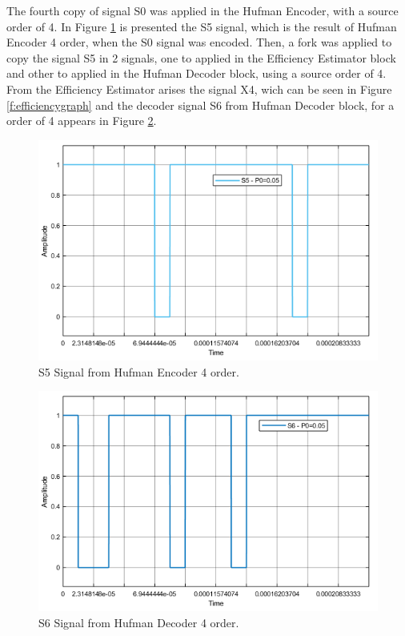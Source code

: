 \begin{refsection}
The fourth copy of signal S0 was applied in the Hufman Encoder, with a source order of 4. In Figure \ref{f:S5} is presented the S5 signal, which is the result of Hufman Encoder 4 order, when the S0 signal was encoded.
Then, a fork was applied to copy the signal S5 in 2 signals, one to applied in the Efficiency Estimator block and other to applied in the Hufman Decoder block, using a source order of 4.
From the Efficiency Estimator arises the signal X4, wich can be seen in Figure \ref{f:efficiencygraph} and the decoder signal S6 from Hufman Decoder block, for a order of 4 appears in Figure \ref{f:S6}.


\begin{figure}[!h]
\centering
\includegraphics[width=5in]{./sdf/eit_45550_estimator_source_code_efficiency/figures/S5.png}
\caption[S5 Signal from Hufman Encoder 4 order.]{S5 Signal from Hufman Encoder 4 order.}
\label{f:S5}
\end{figure}


\begin{figure}[!h]
\centering
\includegraphics[width=5in]{./sdf/eit_45550_estimator_source_code_efficiency/figures/S6.png}
\caption[S6 Signal from Hufman Decoder 4 order.]{S6 Signal from Hufman Decoder 4 order.}
\label{f:S6}
\end{figure}


\end{refsection}
